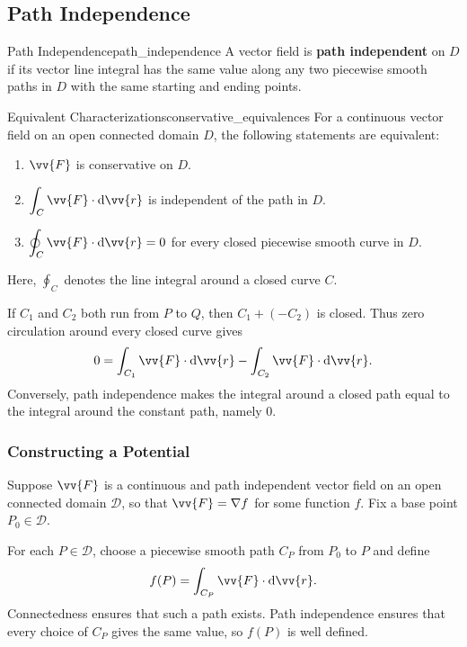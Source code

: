 \newpage
\subsection{Path Independence}
\begin{definition}{Path Independence}{path_independence}
A vector field is \textbf{path independent} on $D$ if its vector line integral has the same value along any two piecewise smooth paths in $D$ with the same starting and ending points.
\end{definition}

\begin{theorem}{Equivalent Characterizations}{conservative_equivalences}
For a continuous vector field on an open connected domain $D$, the following statements are equivalent:
\begin{enumerate}
    \item $\vv{F}$ is conservative on $D$. \vspace{0.5em}
    \item $\displaystyle\int_C\vv{F}\cdot\dd{\vv{r}}$ is independent of the path in $D$. \vspace{0.5em}
    \item $\displaystyle\oint_C\vv{F}\cdot\dd{\vv{r}} = 0$ for every closed piecewise smooth curve in $D$. \vspace{0.5em}
\end{enumerate}

Here, $\displaystyle\oint_C$ denotes the line integral around a closed curve $C$.
\end{theorem}

If $C_1$ and $C_2$ both run from $P$ to $Q$, then $C_1 + (-C_2)$ is closed. Thus zero circulation around every closed curve gives
\[
    0 = \int_{C_1}\vv{F}\cdot\dd{\vv{r}} - \int_{C_2}\vv{F}\cdot\dd{\vv{r}}.
\]
Conversely, path independence makes the integral around a closed path equal to the integral around the constant path, namely $0$.

\subsubsection{Constructing a Potential}

Suppose $\vv{F}$ is a continuous and path independent vector field on an open connected
domain $\mathcal{D}$, so that $\vv{F} = \nabla f$ for some function $f$. Fix a base point $P_0 \in \mathcal{D}$.

For each $P \in \mathcal{D}$, choose a piecewise smooth path $C_P$ from $P_0$ to $P$
and define
\[
    f(P) = \int_{C_P} \vv{F}\cdot\dd{\vv{r}}.
\]
Connectedness ensures that such a path exists. Path independence ensures
that every choice of $C_P$ gives the same value, so $f(P)$ is well defined.

